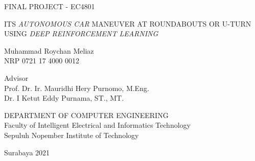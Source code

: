FINAL PROJECT - EC4801

\vspace{6ex}

\begin{large}
  ITS \textit{AUTONOMOUS CAR }MANEUVER AT ROUNDABOUTS OR U-TURN USING \textit{DEEP REINFORCEMENT LEARNING}
\end{large}

\vspace{4ex}

Muhammad Roychan Meliaz\\
NRP 0721 17 4000 0012

\vspace{2ex}

Advisor \\
Prof. Dr. Ir. Mauridhi Hery Purnomo, M.Eng. \\
Dr. I Ketut Eddy Purnama, ST., MT.

\vspace{6ex}

DEPARTMENT OF COMPUTER ENGINEERING\\
Faculty of Intelligent Electrical and Informatics Technology\\
Sepuluh Nopember Institute of Technology

Surabaya 2021
